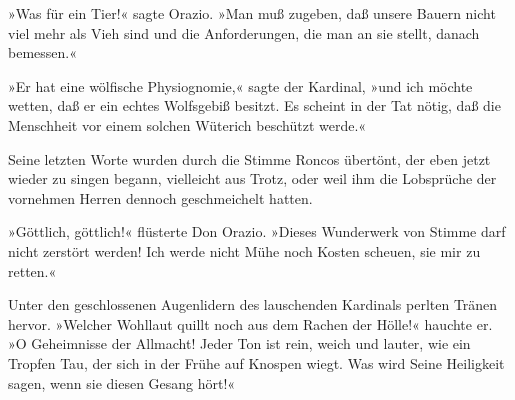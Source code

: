 »Was für ein Tier!« sagte Orazio. »Man muß zugeben, daß unsere
Bauern nicht viel mehr als Vieh sind und die Anforderungen, die man
an sie stellt, danach bemessen.«

»Er hat eine wölfische Physiognomie,« sagte der Kardinal, »und ich
möchte wetten, daß er ein echtes Wolfsgebiß besitzt. Es scheint in
der Tat nötig, daß die Menschheit vor einem solchen Wüterich
beschützt werde.«

Seine letzten Worte wurden durch die Stimme Roncos übertönt, der
eben jetzt wieder zu singen begann, vielleicht aus Trotz, oder weil
ihm die Lobsprüche der vornehmen Herren dennoch geschmeichelt
hatten.

»Göttlich, göttlich!« flüsterte Don Orazio. »Dieses Wunderwerk von
Stimme darf nicht zerstört werden! Ich werde nicht Mühe noch Kosten
scheuen, sie mir zu retten.«

Unter den geschlossenen Augenlidern des lauschenden Kardinals
perlten Tränen hervor. »Welcher Wohllaut quillt noch aus dem Rachen
der Hölle!« hauchte er. »O Geheimnisse der Allmacht! Jeder Ton ist
rein, weich und lauter, wie ein\pagenum{[71]} Tropfen Tau, der
sich in der Frühe auf Knospen wiegt. Was wird Seine Heiligkeit
sagen, wenn sie diesen Gesang hört!«


